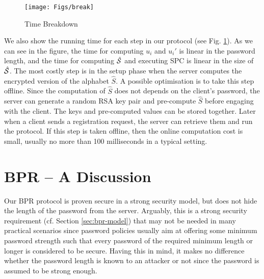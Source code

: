\begin{figure}[!bp]
\centering
\texttt{[image: Figs/break]}
\caption{Time Breakdown}\label{fig::break}%
\end{figure}

We also show the running time for each step in our protocol (see Fig. \ref{fig::break}). As we can see in the figure, the time for computing $u_i$ and $u_i'$ is linear in the password length, and the time for computing $\hat{\mathcal{S}}$ and executing SPC is linear in the size of $\hat{\mathcal{S}}$. The most costly step is in the setup phase when the server computes the encrypted version of the alphabet $\hat{S}$. A possible optimisation is to take this step offline. 
Since the computation of $\hat{S}$ does not depends on the client's password, the server can generate a random RSA key pair and pre-compute $\hat{S}$ before engaging with the client. 
The keys and pre-computed values can be stored together. Later when a client sends a registration request, the server can retrieve them and run the protocol. If this step is taken offline, then the online computation cost is small, usually no more than 100 milliseconds in a typical setting. 

\section{BPR -- A Discussion} \label{sec:discussion}
Our BPR protocol is proven secure in a strong security model, but does not hide the length of the password from the server. Arguably, this is a strong security requirement (cf. Section \ref{sec:bpr-model}) that may not be needed in many practical scenarios since password policies usually aim at offering some minimum password strength such that every password of the required minimum length or longer is considered to be secure.
Having this in mind, it makes no difference whether the password length is known to an attacker or not since the password is assumed to be strong enough.


